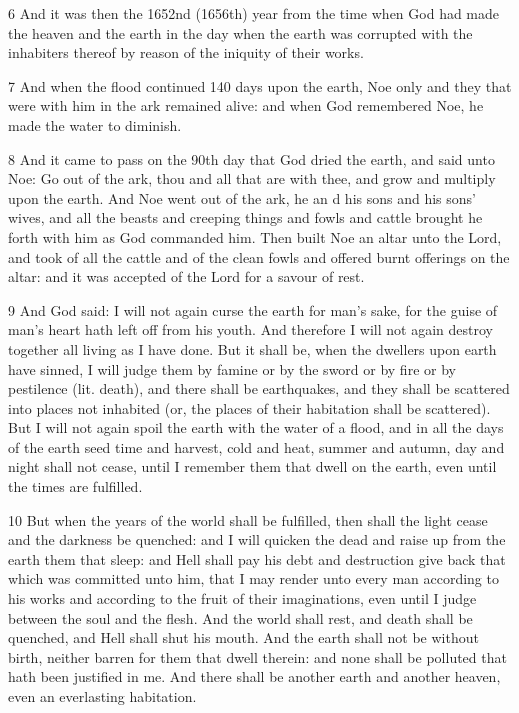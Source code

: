 \par 6 And it was then the 1652nd (1656th) year from the time when God had made the heaven and the earth in the day when the earth was corrupted with the inhabiters thereof by reason of the iniquity of their works.

\par 7 And when the flood continued 140 days upon the earth, Noe only and they that were with him in the ark remained alive: and when God remembered Noe, he made the water to diminish.

\par 8 And it came to pass on the 90th day that God dried the earth, and said unto Noe: Go out of the ark, thou and all that are with thee, and grow and multiply upon the earth. And Noe went out of the ark, he an d his sons and his sons' wives, and all the beasts and creeping things and fowls and cattle brought he forth with him as God commanded him. Then built Noe an altar unto the Lord, and took of all the cattle and of the clean fowls and offered burnt offerings on the altar: and it was accepted of the Lord for a savour of rest.

\par 9 And God said: I will not again curse the earth for man's sake, for the guise of man's heart hath left off from his youth. And therefore I will not again destroy together all living as I have done. But it shall be, when the dwellers upon earth have sinned, I will judge them by famine or by the sword or by fire or by pestilence (lit. death), and there shall be earthquakes, and they shall be scattered into places not inhabited (or, the places of their habitation shall be scattered). But I will not again spoil the earth with the water of a flood, and in all the days of the earth seed time and harvest, cold and heat, summer and autumn, day and night shall not cease, until I remember them that dwell on the earth, even until the times are fulfilled. 

\par 10 But when the years of the world shall be fulfilled, then shall the light cease and the darkness be quenched: and I will quicken the dead and raise up from the earth them that sleep: and Hell shall pay his debt and destruction give back that which was committed unto him, that I may render unto every man according to his works and according to the fruit of their imaginations, even until I judge between the soul and the flesh. And the world shall rest, and death shall be quenched, and Hell shall shut his mouth. And the earth shall not be without birth, neither barren for them that dwell therein: and none shall be polluted that hath been justified in me. And there shall be another earth and another heaven, even an everlasting habitation.

